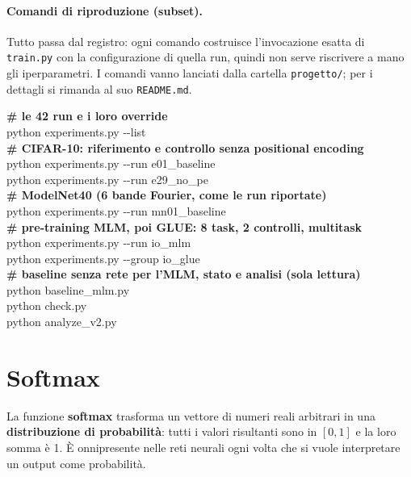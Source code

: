 \documentclass[
  11pt,
]{article}
\begin{document}
\paragraph{Comandi di riproduzione (subset).} Tutto passa dal registro: ogni comando costruisce l'invocazione esatta di \texttt{train.py} con la configurazione di quella run, quindi non serve riscrivere a mano gli iperparametri. I comandi vanno lanciati dalla cartella \texttt{progetto/}; per i dettagli si rimanda al suo \texttt{README.md}.

\begin{tcolorbox}[colback=gray!5, colframe=gray!40, boxrule=0.5pt, arc=2pt, left=6pt, right=6pt, top=4pt, bottom=4pt, fontupper=\ttfamily\footnotesize]
\textbf{\# le 42 run e i loro override} \\
python experiments.py -{}-list \\[6pt]

\textbf{\# CIFAR-10: riferimento e controllo senza positional encoding} \\
python experiments.py -{}-run e01\_baseline \\
python experiments.py -{}-run e29\_no\_pe \\[6pt]

\textbf{\# ModelNet40 (6 bande Fourier, come le run riportate)} \\
python experiments.py -{}-run mn01\_baseline \\[6pt]

\textbf{\# pre-training MLM, poi GLUE: 8 task, 2 controlli, multitask} \\
python experiments.py -{}-run io\_mlm \\
python experiments.py -{}-group io\_glue \\[6pt]

\textbf{\# baseline senza rete per l'MLM, stato e analisi (sola lettura)} \\
python baseline\_mlm.py \\
python check.py \\
python analyze\_v2.py
\end{tcolorbox}


\appendix

\section{Softmax}
\label{app:softmax}

La funzione \textbf{softmax} trasforma un vettore di numeri reali arbitrari in una \textbf{distribuzione di probabilità}: tutti i valori risultanti sono in $[0,1]$ e la loro somma è 1. È onnipresente nelle reti neurali ogni volta che si vuole interpretare un output come probabilità.
\end{document}
